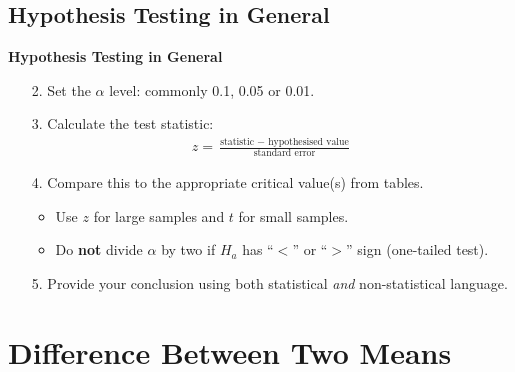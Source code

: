 \documentclass[compress]{beamer}        %
\makeatletter
\newcommand{\tcb}{\textcolor{beamer@blendedblue}}
\makeatother
\begin{document}
\subsection{Hypothesis Testing in General}
\begin{frame}{\bf \tcb{Hypothesis Testing in General}}

\begin{enumerate}\itemsep0.6cm
\item[2.] Set the $\alpha$ level: commonly 0.1, 0.05 or 0.01.
\item[3.] Calculate the test statistic:
\begin{align*}
\boxed{z = \frac{\text{statistic }-\text{ hypothesised value}}{\text{standard error}}}
\end{align*}
\item[4.] Compare this to the appropriate critical value(s) from tables.\\[0.1cm]
 \begin{itemize}\itemsep0.3cm
 \item Use $z$ for large samples and $t$ for small samples.
 \item Do {\bf not} divide $\alpha$ by two if $H_a$ has ``$<$'' or ``$>$'' sign (one-tailed test).
 \end{itemize}
\item[5.] Provide your conclusion using both statistical \emph{and} non-statistical language.\\
\end{enumerate}

\end{frame}



\section{Difference Between Two Means}
\end{document}
